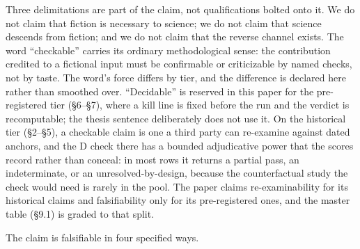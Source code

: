 \documentclass[11pt,a4paper]{article}
\begin{document}
Three delimitations are part of the claim, not qualifications bolted onto it. We do not claim that fiction is necessary to science; we do not claim that science descends from fiction; and we do not claim that the reverse channel exists. The word ``checkable'' carries its ordinary methodological sense: the contribution credited to a fictional input must be confirmable or criticizable by named checks, not by taste. The word's force differs by tier, and the difference is declared here rather than smoothed over. ``Decidable'' is reserved in this paper for the pre-registered tier (§6–§7), where a kill line is fixed before the run and the verdict is recomputable; the thesis sentence deliberately does not use it. On the historical tier (§2–§5), a checkable claim is one a third party can re-examine against dated anchors, and the D check there has a bounded adjudicative power that the scores record rather than conceal: in most rows it returns a partial pass, an indeterminate, or an unresolved-by-design, because the counterfactual study the check would need is rarely in the pool. The paper claims re-examinability for its historical claims and falsifiability only for its pre-registered ones, and the master table (§9.1) is graded to that split.

The claim is falsifiable in four specified ways.
\end{document}
